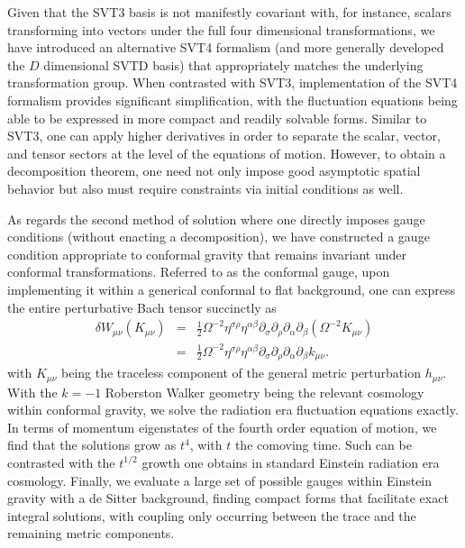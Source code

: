 Given that the SVT3 basis is not manifestly covariant with, for instance, scalars transforming into vectors under the full four dimensional transformations, we have introduced an alternative SVT4 formalism (and more generally developed the $D$ dimensional SVTD basis) that appropriately matches the underlying transformation group. When contrasted with SVT3, implementation of the SVT4 formalism provides significant simplification, with the fluctuation equations being able to be expressed in more compact and readily solvable forms. Similar to SVT3, one can apply higher derivatives in order to separate the scalar, vector, and tensor sectors at the level of the equations of motion. However, to obtain a decomposition theorem, one need not only impose good asymptotic spatial behavior but also must require constraints via initial conditions as well. 

As regards the second method of solution where one directly imposes gauge conditions (without enacting a decomposition), we have constructed a gauge condition appropriate to conformal gravity that remains invariant under conformal transformations. Referred to as the conformal gauge, upon implementing it within a generical conformal to flat background, one can express the entire perturbative Bach tensor succinctly as
%
\begin{eqnarray}
\delta W_{\mu\nu}(K_{\mu\nu})&=&\frac{1}{2}\Omega^{-2}\eta^{\sigma\rho}\eta^{\alpha\beta}\partial_{\sigma}\partial_{\rho} \partial_{\alpha}\partial_{\beta}(\Omega^{-2}K_{\mu\nu})
\nonumber\\
&=&\frac{1}{2}\Omega^{-2}\eta^{\sigma\rho}\eta^{\alpha\beta}\partial_{\sigma}\partial_{\rho} \partial_{\alpha}\partial_{\beta}k_{\mu\nu}.
\nonumber
\end{eqnarray}
%
with $K_{\mu\nu}$ being the traceless component of the general metric perturbation $h_{\mu\nu}$. With the $k=-1$ Roberston Walker geometry being the relevant cosmology within conformal gravity, we solve the radiation era fluctuation equations exactly. In terms of momentum eigenstates of the fourth order equation of motion, we find that the solutions grow as $t^4$, with $t$ the comoving time. Such can be contrasted with the $t^{1/2}$ growth one obtains in standard Einstein radiation era cosmology. Finally, we evaluate a large set of possible gauges within Einstein gravity with a de Sitter background, finding compact forms that facilitate exact integral solutions, with coupling only occurring between the trace and the remaining metric components. 




